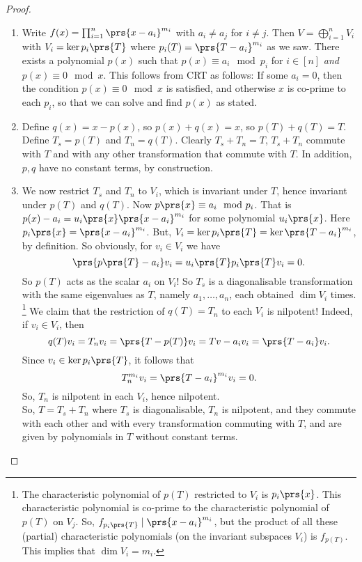 \documentclass[10pt,a4paper,twoside,openany,hidelinks]{book}
\begin{document}
\begin{proof}
\begin{enumerate}[label = (\Roman*)]
\item
Write $f(x) = \prod_{i=1}^n \prs{x-a_i}^{m_i}$ with $a_i \neq a_j$ for $i \neq j$. Then $V = \bigoplus_{i=1}^n V_i$ with $V_i = \ker p_i\prs{T}$ where $p_i(T) = \prs{T-a_i}^{m_i}$ as we saw. There exists a polynomial $p(x)$ such that $p(x) \equiv a_i \mod{p_i}$ for $i \in [n]$ \emph{and} $p(x) \equiv 0 \mod{x}$. This follows from CRT as follows:
If some $a_i = 0$, then the condition $p(x) \equiv 0 \mod{x}$ is satisfied, and otherwise $x$ is co-prime to each $p_i$, so that we can solve and find $p(x)$ as stated.
\item Define $q(x) = x - p(x)$, so $p(x) + q(x) = x$, so $p(T) + q(T) = T$. Define $T_s = p(T)$ and $T_n = q(T)$. Clearly $T_s + T_n = T$, $T_s + T_n$ commute with $T$ and with any other transformation that commute with $T$. In addition, $p,q$ have no constant terms, by construction.
\item We now restrict $T_s$ and $T_n$ to $V_i$, which is invariant under $T$, hence invariant under $p(T)$ and $q(T)$. Now $p\prs{x} \equiv a_i \mod{p_i}$. That is $p(x) - a_i = u_i\prs{x} \prs{x - a_i}^{m_i}$ for some polynomial $u_i\prs{x}$. Here $p_i\prs{x} = \prs{x-a_i}^{m_i}$.
But, $V_i = \ker p_i\prs{T} = \ker \prs{T - a_i}^{m_i}$, by definition. So obviously, for $v_i \in V_i$ we have \[\prs{p\prs{T} - a_i}v_i = u_i\prs{T}p_i\prs{T}v_i = 0\text{.}\]
So $p(T)$ acts as the scalar $a_i$ on $V_i$! So $T_s$ is a diagonalisable transformation with the same eigenvalues as $T$, namely $a_1, \ldots, a_n$, each obtained $\dim V_i$ times.%
\footnote{{The characteristic polynomial of $p(T)$ restricted to $V_i$ is $p_i\prs{x}$.
This characteristic polynomial is co-prime to the characteristic polynomial of $p(T)$ on $V_j$. So, $f_{p_i\prs{T}} \mid \prs{x-a_i}^{m_i}$, but the product of all these (partial) characteristic polynomials (on the invariant subspaces $V_i$) is $f_{p(T)}$. This implies that $\dim V_i = m_i$.}}%
We claim that the restriction of $q(T) = T_n$ to each $V_i$ is nilpotent! Indeed, if $v_i \in V_i$, then \[q(T)v_i = T_n v_i = \prs{T - p(T)}v_i = Tv - a_i v_i = \prs{T - a_i}v_i \text{.}\]
Since $v_i \in \ker p_i\prs{T}$, it follows that \[T_n^{m_i} v_i = \prs{T - a_i}^{m_i}v_i = 0\text{.}\]
So, $T_n$ is nilpotent in each $V_i$, hence nilpotent.\\
So, $T = T_s + T_n$ where $T_s$ is diagonalisable, $T_n$ is nilpotent, and they commute with each other and with every transformation commuting with $T$, and are given by polynomials in $T$ without constant terms.\\

\end{enumerate}
\end{proof}
\end{document}
